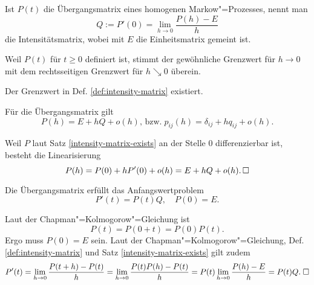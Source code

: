 \begin{Definition}[Intensitätsmatrix]%
\label{def:intensity-matrix}\newlinefirst
Ist $P(t)$ die Übergangsmatrix eines homogenen Markow"=Prozesses, nennt man
\[Q := P'(0) = \lim_{h\to 0}\frac{P(h)-E}{h}\]
die Intensitätsmatrix, wobei mit $E$ die Einheitsmatrix gemeint ist.
\end{Definition}
 Weil $P(t)$ für $t\ge 0$ definiert ist, stimmt der
gewöhnliche Grenzwert für $h\to 0$ mit dem rechtsseitigen Grenzwert
für $h\searrow 0$ überein.

\begin{Satz}\label{intensity-matrix-exists}
Der Grenzwert in Def. \ref{def:intensity-matrix} existiert.
\end{Satz}

\begin{Satz}
Für die Übergangsmatrix gilt
\[P(h) = E + hQ + o(h),\,\text{bzw.}\; p_{ij}(h) = \delta_{ij} + hq_{ij} + o(h).\]
\end{Satz}
\begin{Beweis}
Weil $P$ laut Satz \ref{intensity-matrix-exists} an der Stelle $0$
differenzierbar ist, besteht die Linearisierung
\[P(h) = P(0) + hP'(0) + o(h) = E + hQ + o(h).\,\square\]
\end{Beweis}

\begin{Satz}\newlinefirst
Die Übergangsmatrix erfüllt das Anfangswertproblem
\[P'(t)=P(t)Q,\quad P(0)=E.\]
\end{Satz}
\begin{Beweis}
Laut der Chapman"=Kolmogorow"=Gleichung ist
\[P(t) = P(0+t) = P(0)P(t).\]
Ergo muss $P(0)=E$ sein. Laut der Chapman"=Kolmogorow"=Gleichung,
Def. \ref{def:intensity-matrix} und Satz \ref{intensity-matrix-exists}
gilt zudem
\[P'(t) = \lim_{h\to 0}\frac{P(t+h)-P(t)}{h}
= \lim_{h\to 0}\frac{P(t)P(h)-P(t)}{h}
= P(t)\lim_{h\to 0}\frac{P(h)-E}{h} = P(t)Q.\;\square\]
\end{Beweis}

